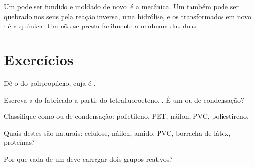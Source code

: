 \begin{remark}\label{rem:g12:polymers:recycling}
Um  pode ser fundido e moldado de novo: é a 
mecânica. Um  também pode ser quebrado nos seus
 pela reação inversa, uma hidrólise, e os 
transformados em novo : é a  química. Um  não
se presta facilmente a nenhuma das duas.
\end{remark}

\section{Exercícios}

\begin{exercise}[$\star$]\label{exo:g12:polymers:1}
Dê o  do polipropileno, cuja  é
.
\end{exercise}

\begin{exercise}[$\star$]\label{exo:g12:polymers:2}
Escreva a  do  fabricado a partir do
tetrafluoroeteno, . É um  ou de
condensação?
\end{exercise}

\begin{exercise}[$\star$]\label{exo:g12:polymers:3}
Classifique como  ou de condensação: polietileno,
PET, náilon, PVC, poliestireno.
\end{exercise}

\begin{exercise}[$\star$]\label{exo:g12:polymers:4}
Quais destes  são naturais: celulose, náilon, amido, PVC,
borracha de látex, proteínas?
\end{exercise}

\begin{exercise}[$\star$]\label{exo:g12:polymers:5}
Por que cada  de um  deve carregar dois
grupos reativos?
\end{exercise}

